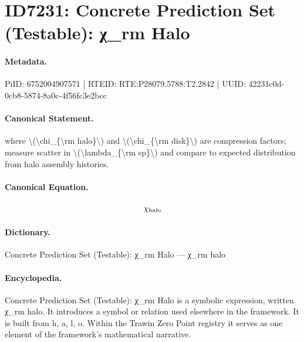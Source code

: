 \section*{ID7231: Concrete Prediction Set (Testable): χ\_rm Halo}
\paragraph{Metadata.}
PiID: 6752004907571 | RTEID: RTE:P28079.5788:T2.2842 | UUID: 42231c0d-0cb8-5874-8a0c-4f56fc3e2bcc

\paragraph{Canonical Statement.}
where \textbackslash{}(\textbackslash{}chi\_\{\textbackslash{}rm halo\}\textbackslash{}) and \textbackslash{}(\textbackslash{}chi\_\{\textbackslash{}rm disk\}\textbackslash{}) are compression factors; measure scatter in \textbackslash{}(\textbackslash{}lambda\_\{\textbackslash{}rm sp\}\textbackslash{}) and compare to expected distribution from halo assembly histories.

\paragraph{Canonical Equation.}
\[
\chi_{\rm halo}
\]

\paragraph{Dictionary.}
Concrete Prediction Set (Testable): χ\_rm Halo — χ\_rm halo

\paragraph{Encyclopedia.}
Concrete Prediction Set (Testable): χ\_rm Halo is a symbolic expression, written χ\_rm halo. It introduces a symbol or relation used elsewhere in the framework. It is built from h, a, l, o. Within the Trawin Zero Point registry it serves as one element of the framework's mathematical narrative.
